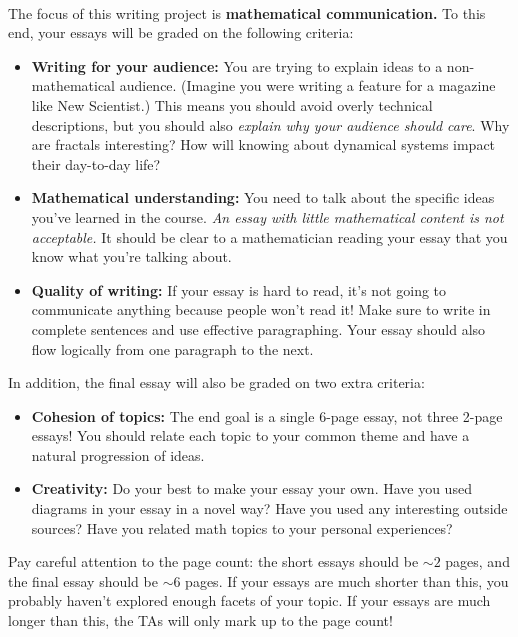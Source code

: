 \documentclass[12pt]{article}
\def\mydot{\textcolor{deepblue}{\rule{1ex}{1ex}}}
\newlength\sidebarwidth
\newcommand{\topic}[3][]%
	 {\pagebreak[2]%
	 \vspace{.2cm}
	 \begin{minipage}{\textwidth}
         \phantomsection\addcontentsline{toc}{section}{#1}%
         \nopagebreak\hspace{0in}%
         \nopagebreak\begin{minipage}[t]{\sidebarwidth - .2cm}
         \raggedleft \bf\sc 
	 \color{myblue}{\large #2}
	 \end{minipage}%
	 \hfill
	 \begin{minipage}[t]{\linewidth - \sidebarwidth}
	 \nopagebreak{\color{myblue}%
		    \rule{0pt}{\baselineskip}%
		    \rule{\linewidth}{2.5pt}%
		    \llap{\raisebox{.3\baselineskip}{\sf #1}}%
		    \vspace*{.1\baselineskip}%
		    }%
	 #3%
	 \end{minipage}
	 \end{minipage}}
\newenvironment{mywidth}{\begin{adjustwidth}{\sidebarwidth}{}}{\end{adjustwidth}}
\begin{document}
	\topic{Grading}{~}
	\begin{mywidth}
		The focus of this writing project is \textbf{mathematical communication.} To this end, your essays will be graded on the following criteria:
		\vspace{-.3cm}	
		\begin{itemize}[leftmargin=1cm, itemsep=0ex, parsep=.5ex, labelindent=-4ex, label={\mydot}]
			\item \textbf{Writing for your audience:}
			You are trying to explain ideas 
			to a non-mathematical audience. (Imagine you
			were writing a feature for a magazine like New
			Scientist.) This means you should avoid overly
			technical descriptions, but you should also \textit{explain why your audience should
			care}. Why are fractals interesting? How will
			knowing about dynamical systems impact their
			day-to-day life?

			\item \textbf{Mathematical understanding:}
			You need to talk about the specific ideas you’ve
			learned in the course. \textit{An essay with
			little mathematical content is not acceptable.}
			It should be clear to a mathematician reading your
			essay that you know what you’re talking about.

			\item \textbf{Quality of writing:}
			If your essay is hard to read, it’s not going to
			communicate anything because people won’t read
			it! Make sure to write in complete sentences and
			use effective paragraphing. Your essay should also
			flow logically from one paragraph to the next.

		\end{itemize}
		
		In addition, the final essay will also be graded on two extra criteria:
		\vspace{-.3cm}
		\begin{itemize}[leftmargin=1cm, itemsep=0ex, parsep=.5ex, labelindent=-4ex, label={\mydot}]
			\item \textbf{Cohesion of topics:}
			The end goal is a single 6-page essay, not three
			2-page essays! You should relate each topic to
			your common theme and have a natural progression
			of ideas.

			\item \textbf{Creativity:} %
			Do your best to make your essay your own. Have you
			used diagrams in your essay in a novel way? Have
			you used any interesting outside sources? Have you related
			math topics to your personal experiences?
		\end{itemize}
		
		Pay careful attention to the page count: the short essays
		should be $\sim\!2$ pages, and the final essay should
		be $\sim\!6$ pages. If your essays are much shorter
		than this, you probably haven't explored enough facets
		of your topic. If your essays are much longer than this,
		the TAs will only mark up to the page count!

	\end{mywidth}
\end{document}

